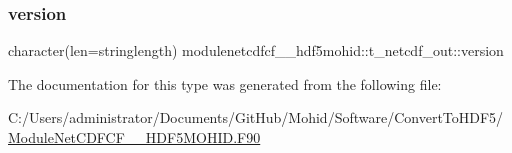 \subsubsection{\texorpdfstring{version}{version}}
{\footnotesize\ttfamily character(len=stringlength) modulenetcdfcf\+\_\+\_\+hdf5mohid\+::t\+\_\+netcdf\+\_\+out\+::version\hspace{0.3cm}{\ttfamily [private]}}



The documentation for this type was generated from the following file\+:\begin{DoxyCompactItemize}
\item 
C\+:/\+Users/administrator/\+Documents/\+Git\+Hub/\+Mohid/\+Software/\+Convert\+To\+H\+D\+F5/\mbox{\hyperlink{_module_net_c_d_f_c_f__2___h_d_f5_m_o_h_i_d_8_f90}{Module\+Net\+C\+D\+F\+C\+F\+\_\+\_\+\+H\+D\+F5\+M\+O\+H\+I\+D.\+F90}}\end{DoxyCompactItemize}
